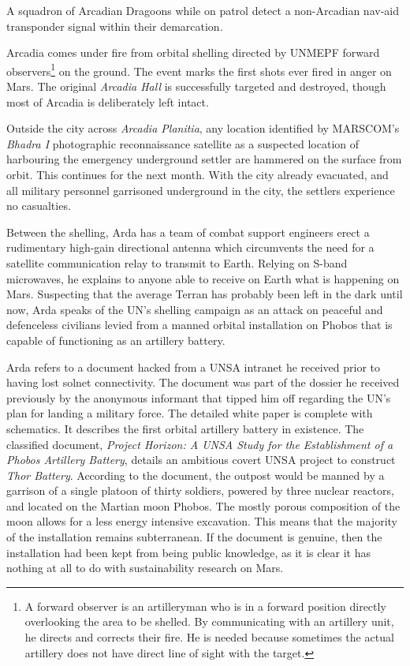 

A squadron of Arcadian Dragoons while on patrol detect a non-Arcadian nav-aid transponder signal within their demarcation.
\StopTimelineDate

Arcadia comes under fire from orbital shelling directed by UNMEPF forward observers\footnote{A forward observer is an artilleryman who is in a forward position directly overlooking the area to be shelled. By communicating with an artillery unit, he directs and corrects their fire. He is needed because sometimes the actual artillery does not have direct line of sight with the target.} on the ground. The event marks the first shots ever fired in anger on Mars. The original {\it Arcadia Hall} is successfully targeted and destroyed, though most of Arcadia is deliberately left intact. 

Outside the city across {\it Arcadia Planitia}, any location identified by MARSCOM's {\it Bhadra I} photographic reconnaissance satellite as a suspected location of harbouring the emergency underground settler are hammered on the surface from orbit. This continues for the next month. With the city already evacuated, and all military personnel garrisoned underground in the city, the settlers experience no casualties.

Between the shelling, Arda has a team of combat support engineers erect a rudimentary high-gain directional antenna which circumvents the need for a satellite communication relay to transmit to Earth. Relying on S-band microwaves, he explains to anyone able to receive on Earth what is happening on Mars. Suspecting that the average Terran has probably been left in the dark until now, Arda speaks of the UN's shelling campaign as an attack on peaceful and defenceless civilians levied from a manned orbital installation on Phobos that is capable of functioning as an artillery battery.

Arda refers to a document hacked from a UNSA intranet he received prior to having lost solnet connectivity. The document was part of the dossier he received previously by the anonymous informant that tipped him off regarding the UN's plan for landing a military force. The detailed white paper is complete with schematics. It describes the first orbital artillery battery in existence. The classified document, {\it Project Horizon: A UNSA Study for the Establishment of a Phobos Artillery Battery}, details an ambitious covert UNSA project to construct {\it Thor Battery}. According to the document, the outpost would be manned by a garrison of a single platoon of thirty soldiers, powered by three nuclear reactors, and located on the Martian moon Phobos. The mostly porous composition of the moon allows for a less energy intensive excavation. This means that the majority of the installation remains subterranean. If the document is genuine, then the installation had been kept from being public knowledge, as it is clear it has nothing at all to do with sustainability research on Mars. 

